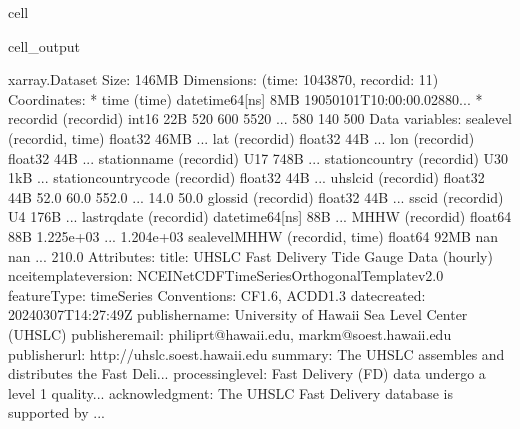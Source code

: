 \documentclass[letterpaper,10pt,english]{jupyterBook}
\begin{document}
\begin{sphinxuseclass}{cell}
\begin{sphinxVerbatimOutput}
\begin{sphinxuseclass}{cell_output}
\begin{sphinxVerbatim}[commandchars=\\\{\}]
\PYGZlt{}xarray.Dataset\PYGZgt{} Size: 146MB
Dimensions:               (time: 1043870, record\PYGZus{}id: 11)
Coordinates:
  * time                  (time) datetime64[ns] 8MB 1905\PYGZhy{}01\PYGZhy{}01T10:00:00.02880...
  * record\PYGZus{}id             (record\PYGZus{}id) int16 22B 520 600 5520 ... 580 140 500
Data variables:
    sea\PYGZus{}level             (record\PYGZus{}id, time) float32 46MB ...
    lat                   (record\PYGZus{}id) float32 44B ...
    lon                   (record\PYGZus{}id) float32 44B ...
    station\PYGZus{}name          (record\PYGZus{}id) \PYGZlt{}U17 748B ...
    station\PYGZus{}country       (record\PYGZus{}id) \PYGZlt{}U30 1kB ...
    station\PYGZus{}country\PYGZus{}code  (record\PYGZus{}id) float32 44B ...
    uhslc\PYGZus{}id              (record\PYGZus{}id) float32 44B 52.0 60.0 552.0 ... 14.0 50.0
    gloss\PYGZus{}id              (record\PYGZus{}id) float32 44B ...
    ssc\PYGZus{}id                (record\PYGZus{}id) \PYGZlt{}U4 176B ...
    last\PYGZus{}rq\PYGZus{}date          (record\PYGZus{}id) datetime64[ns] 88B ...
    MHHW                  (record\PYGZus{}id) float64 88B 1.225e+03 ... 1.204e+03
    sea\PYGZus{}level\PYGZus{}MHHW        (record\PYGZus{}id, time) float64 92MB nan nan ... \PYGZhy{}210.0
Attributes:
    title:                  UHSLC Fast Delivery Tide Gauge Data (hourly)
    ncei\PYGZus{}template\PYGZus{}version:  NCEI\PYGZus{}NetCDF\PYGZus{}TimeSeries\PYGZus{}Orthogonal\PYGZus{}Template\PYGZus{}v2.0
    featureType:            timeSeries
    Conventions:            CF\PYGZhy{}1.6, ACDD\PYGZhy{}1.3
    date\PYGZus{}created:           2024\PYGZhy{}03\PYGZhy{}07T14:27:49Z
    publisher\PYGZus{}name:         University of Hawaii Sea Level Center (UHSLC)
    publisher\PYGZus{}email:        philiprt@hawaii.edu, markm@soest.hawaii.edu
    publisher\PYGZus{}url:          http://uhslc.soest.hawaii.edu
    summary:                The UHSLC assembles and distributes the Fast Deli...
    processing\PYGZus{}level:       Fast Delivery (FD) data undergo a level 1 quality...
    acknowledgment:         The UHSLC Fast Delivery database is supported by ...
\end{sphinxVerbatim}

\end{sphinxuseclass}\end{sphinxVerbatimOutput}

\end{sphinxuseclass}
\end{document}
